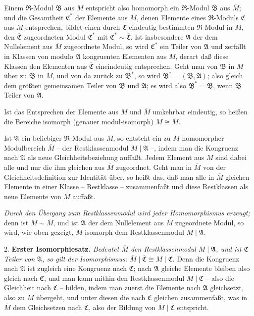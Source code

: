 \documentclass[11pt]{article}
\providecommand{\mR}{\mathfrak{R}}
\providecommand{\mA}{\mathfrak{A}}
\providecommand{\mB}{\mathfrak{B}}
\providecommand{\mC}{\mathfrak{C}}
\begin{document}
Einem $\mR$-Modul $\mB$ aus $M$ entspricht also homomorph ein $\mR$-Modul $\overline{\mB}$ aus $\overline M$; und die Gesamtheit $\mC^*$ der Elemente aus $M$, denen Elemente eines $\mR$-Moduls $\overline{\mC}$ aus $\overline M$ entsprechen, bildet einen durch $\overline{\mC}$ eindeutig bestimmten $\mR$-Modul in $M$, den $\overline{\mC}$ zugeordneten Modul $\mC^*$ mit $\mC^*\sim\overline{\mC}$. Ist insbesondere $\mA$ der dem Nullelement aus $\overline M$ zugeordnete Modul, so wird $\mC^*$ ein Teiler von $\mA$ und zerfällt in Klassen von modulo $\mA$ kongruenten Elementen aus $M$, derart daß diese Klassen den Elementen aus $\overline{\mC}$ eineindeutig entsprechen. Geht man von $\mB$ in $M$ über zu $\overline{\mB}$ in $\overline M$, und von da zurück zu $\mB^*$, so wird $\mB^*=(\mB,\mA)$; also gleich dem größten gemeinsamen Teiler von $\mB$ und $\mA$; es wird also $\mB^*=\mB$, wenn $\mB$ Teiler von $\mA$.

Ist das Entsprechen der Elemente aus $M$ und $\overline M$ umkehrbar eindeutig, so heißen die Bereiche isomorph (genauer modul-isomorph) $M\cong\overline M$.

Ist $\mA$ ein beliebiger $\mR$-Modul aus $M$, so entsteht ein zu $M$ homomorpher Modulbereich $\overline M$ -- der Restklassenmodul $M\mid\mA$ --, indem man die Kongruenz nach $\mA$ als neue Gleichheitsbeziehung auffaßt. Jedem Element aus $M$ sind dabei alle und nur die ihm gleichen aus $\overline M$ zugeordnet. Geht man in $\overline M$ von der Gleichheitsdefinition zur Identität über, so heißt das, daß man alle in $\overline M$ gleichen Elemente in einer Klasse -- Restklasse -- zusammenfaßt und diese Restklassen als neue Elemente von $\overline M$ auffaßt.

\emph{Durch den Übergang zum Restklassenmodul wird jeder Homomorphismus erzeugt;} denn ist $M\sim\overline M$, und ist $\mA$ der dem Nullelement aus $\overline M$ zugeordnete Modul, so wird, wie oben gezeigt, $\overline M$ isomorph dem Restklassenmodul $M\mid\mA$.

2. \textbf{Erster Isomorphiesatz.} \emph{Bedeutet $\overline M$ den Restklassenmodul $M\mid\mA$, und ist $\mC$ Teiler von $\mA$, so gilt der Isomorphismus: $\overline M\mid\overline{\mC}\cong M\mid\mC$.} Denn die Kongruenz nach $\mA$ ist zugleich eine Kongruenz nach $\mC$; nach $\mA$ gleiche Elemente bleiben also gleich nach $\mC$, und man kann mithin den Restklassenmodul $M\mid\mC$ -- also die Gleichheit nach $\mC$ -- bilden, indem man zuerst die Elemente nach $\mA$ gleichsetzt, also zu $\overline M$ übergeht, und unter diesen die nach $\mC$ gleichen zusammenfaßt, was in $\overline M$ dem Gleichsetzen nach $\overline{\mC}$, also der Bildung von $\overline M\mid\overline{\mC}$ entspricht.
\end{document}
